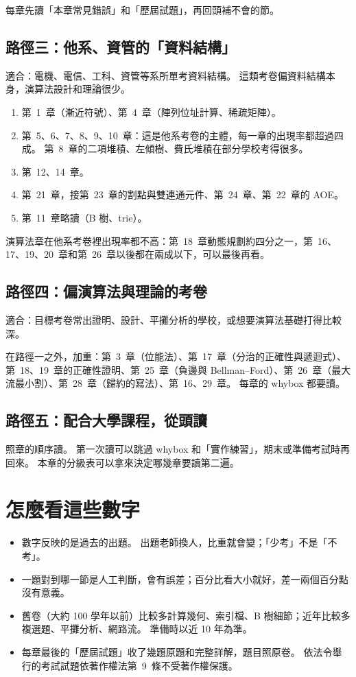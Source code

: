 每章先讀「本章常見錯誤」和「歷屆試題」，再回頭補不會的節。

\subsection*{路徑三：他系、資管的「資料結構」}

適合：電機、電信、工科、資管等系所單考資料結構。 這類考卷偏資料結構本身，演算法設計和理論很少。

\begin{enumerate}
\item 第~1~章（漸近符號）、第~4~章（陣列位址計算、稀疏矩陣）。
\item 第~5、6、7、8、9、10~章：這是他系考卷的主體，每一章的出現率都超過四成。 第~8~章的二項堆積、左傾樹、費氏堆積在部分學校考得很多。
\item 第~12、14~章。
\item 第~21~章，接第~23~章的割點與雙連通元件、第~24~章、第~22~章的 AOE。
\item 第~11~章略讀（B 樹、trie）。
\end{enumerate}

演算法章在他系考卷裡出現率都不高：第~18~章動態規劃約四分之一，第~16、17、19、20~章和第~26~章以後都在兩成以下，可以最後再看。

\subsection*{路徑四：偏演算法與理論的考卷}

適合：目標考卷常出證明、設計、平攤分析的學校，或想要演算法基礎打得比較深。

在路徑一之外，加重：第~3~章（位能法）、第~17~章（分治的正確性與遞迴式）、第~18、19~章的正確性證明、第~25~章（負邊與 Bellman--Ford）、第~26~章（最大流最小割）、第~28~章（歸約的寫法）、第~16、29~章。 每章的 whybox 都要讀。

\subsection*{路徑五：配合大學課程，從頭讀}

照章的順序讀。 第一次讀可以跳過 whybox 和「實作練習」，期末或準備考試時再回來。 本章的分級表可以拿來決定哪幾章要讀第二遍。

\section*{怎麼看這些數字}

\begin{itemize}
\item 數字反映的是過去的出題。 出題老師換人，比重就會變；「少考」不是「不考」。
\item 一題對到哪一節是人工判斷，會有誤差；百分比看大小就好，差一兩個百分點沒有意義。
\item 舊卷（大約 100 學年以前）比較多計算幾何、索引檔、B 樹細節；近年比較多複選題、平攤分析、網路流。 準備時以近 10 年為準。
\item 每章最後的「歷屆試題」收了幾題原題和完整詳解，題目照原卷。 依法令舉行的考試試題依著作權法第~9~條不受著作權保護。
\end{itemize}
